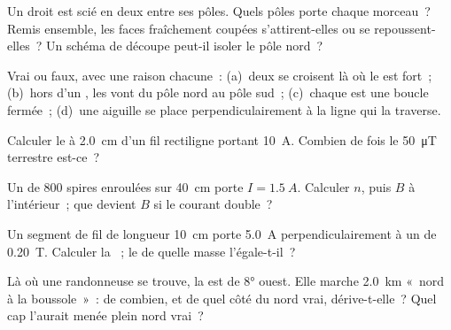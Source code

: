 \begin{exercise}[$\star$]\label{exo:g11:magnetic-fields:1}
Un  droit est scié en deux entre ses
pôles. Quels pôles porte chaque morceau~? Remis ensemble, les faces
fraîchement coupées s'attirent-elles ou se repoussent-elles~? Un
schéma de découpe peut-il isoler le pôle nord~?
\end{exercise}

\begin{exercise}[$\star$]\label{exo:g11:magnetic-fields:2}
Vrai ou faux, avec une raison chacune~: (a)~deux
 se croisent là où le
 est fort~; (b)~hors d'un
, les
 vont du pôle nord au
pôle sud~; (c)~chaque
 est une boucle fermée~;
(d)~une aiguille se place perpendiculairement à la ligne qui la
traverse.
\end{exercise}

\begin{exercise}[$\star$]\label{exo:g11:magnetic-fields:3}
Calculer le  à \qty{2.0}{cm} d'un
fil rectiligne portant \qty{10}{A}. Combien de fois le
\qty{50}{\micro T} terrestre est-ce~?
\end{exercise}

\begin{exercise}[$\star$]\label{exo:g11:magnetic-fields:4}
Un  de $800$ spires enroulées sur
\qty{40}{cm} porte $I = \qty{1.5}{A}$. Calculer $n$, puis $B$ à
l'intérieur~; que devient $B$ si le courant double~?
\end{exercise}

\begin{exercise}[$\star$]\label{exo:g11:magnetic-fields:5}
Un segment de fil de longueur \qty{10}{cm} porte \qty{5.0}{A}
perpendiculairement à un  de
\qty{0.20}{T}. Calculer la ~;
le  de quelle masse l'égale-t-il~?
\end{exercise}

\begin{exercise}[$\star\star$]\label{exo:g11:magnetic-fields:6}
Là où une randonneuse se trouve, la
 est de $\ang{8}$ ouest. Elle
marche \qty{2.0}{km} «~nord à la boussole~»~: de combien, et de quel
côté du nord vrai, dérive-t-elle~? Quel cap l'aurait menée plein nord
vrai~?
\end{exercise}

